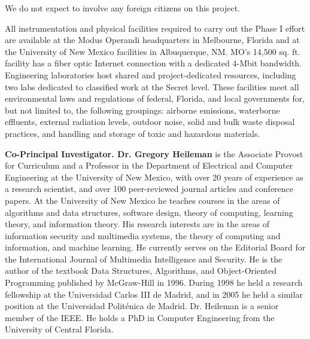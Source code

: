 \documentclass{sbir}
\begin{document}
{
We do not expect to involve any foreign citizens on this project.

 {}
All instrumentation and physical facilities required to carry out the Phase I effort are available at the Modus Operandi headquarters in Melbourne, Florida and at the University of New Mexico facilities in Albuquerque, NM. MO's 14,500 sq. ft. facility has a fiber optic Internet connection with a dedicated 4-Mbit bandwidth. Engineering laboratories host shared and project-dedicated resources, including two labs dedicated to classified work at the Secret level. These facilities meet all environmental laws and regulations of federal, Florida, and local governments for, but not limited to, the following groupings: airborne emissions, waterborne effluents, external radiation levels, outdoor noise, solid and bulk waste disposal practices, and handling and storage of toxic and hazardous materials.

\label{subs}
{\bf Co-Principal Investigator. Dr. Gregory Heileman } is the Associate Provost for Curriculum and a Professor in the Department of Electrical and Computer Engineering at the University of New Mexico, with over 20 years of experience as a research scientist, and over 100 peer-reviewed journal articles and conference papers. At the University of New Mexico he teaches courses in the areas of algorithms and data structures, software design, theory of computing, learning theory, and information theory. His research interests are in the areas of information security and multimedia systems, the theory of computing and information, and machine learning. He currently serves on the Editorial Board for the International Journal of Multimedia Intelligence and Security. He is the author of the textbook Data Structures, Algorithms, and Object-Oriented Programming published by McGraw-Hill in 1996. During 1998 he held a research fellowship at the Universidad Carlos III de Madrid, and in 2005 he held a similar position at the Universidad Polit\'enica de Madrid. Dr. Heileman is a senior member of the IEEE. He holds a PhD in Computer Engineering from the University of Central Florida.

}
\end{document}
